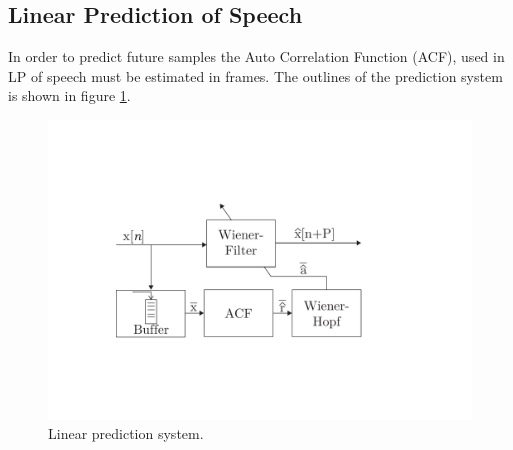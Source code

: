 \subsection{Linear Prediction of Speech}
In order to predict future samples the Auto Correlation Function (ACF), used in LP of speech must be estimated in frames. The outlines of the prediction system is shown in figure \ref{fig:LinearPredictionOverview}.

\begin{figure}[H]
	\centering
	\includegraphics[width=\columnwidth]{figures/ArticleIllustrations/WienerHopf}
	\caption{Linear prediction system.}
	\label{fig:LinearPredictionOverview}
\end{figure}


